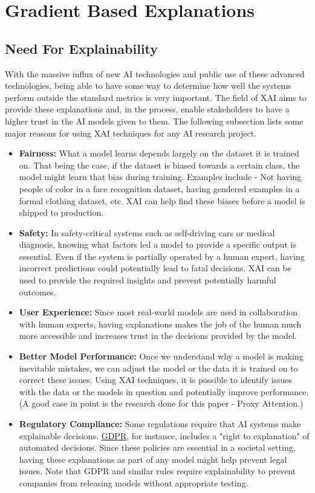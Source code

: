 \documentclass[a4paper,11pt,openright]{book}
\begin{document}
\section{Gradient Based Explanations} \label{sec:gradient_based_explanations}
\subsection{Need For Explainability}
With the massive influx of new AI technologies and public use of these advanced technologies, being able to have some way to determine how well the systems perform outside the standard metrics is very important. The field of XAI aims to provide these explanations and, in the process, enable stakeholders to have a higher trust in the AI models given to them. The following subsection lists some major reasons for using XAI techniques for any AI research project.
\begin{itemize}
    \item \textbf{Fairness: } What a model learns depends largely on the dataset it is trained on. That being the case, if the dataset is biased towards a certain class, the model might learn that bias during training. Examples include - Not having people of color in a face recognition dataset, having gendered examples in a formal clothing dataset, etc. XAI can help find these biases before a model is shipped to production.
    \item \textbf{Safety: } In safety-critical systems such as self-driving cars or medical diagnosis, knowing what factors led a model to provide a specific output is essential. Even if the system is partially operated by a human expert, having incorrect predictions could potentially lead to fatal decisions. XAI can be used to provide the required insights and prevent potentially harmful outcomes.
    \item \textbf{User Experience: } Since most real-world models are used in collaboration with human experts, having explanations makes the job of the human much more accessible and increases trust in the decisions provided by the model.
    \item \textbf{Better Model Performance: } Once we understand why a model is making inevitable mistakes, we can adjust the model or the data it is trained on to correct these issues. Using XAI techniques, it is possible to identify issues with the data or the models in question and potentially improve performance. (A good case in point is the research done for this paper - Proxy Attention.)
    \item \textbf{Regulatory Compliance: } Some regulations require that AI systems make explainable decisions. \href{https://gdpr-info.eu/}{GDPR}, for instance, includes a "right to explanation" of automated decisions. Since these policies are essential in a societal setting, having these explanations as part of any model might help prevent legal issues. Note that GDPR and similar rules require explainability to prevent companies from releasing models without appropriate testing.
    \end{itemize}
\end{document}
